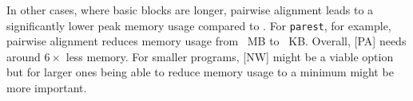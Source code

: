 In other cases, where basic blocks are longer, pairwise alignment leads to a significantly lower peak memory usage compared to {\NW}. For \texttt{parest}, for example, pairwise alignment reduces memory usage from ~MB to ~KB. Overall, {[PA]} needs around $6\times$ less memory. For smaller programs, {[NW]} might be a viable option but for larger ones being able to reduce memory usage to a minimum might be more important.

